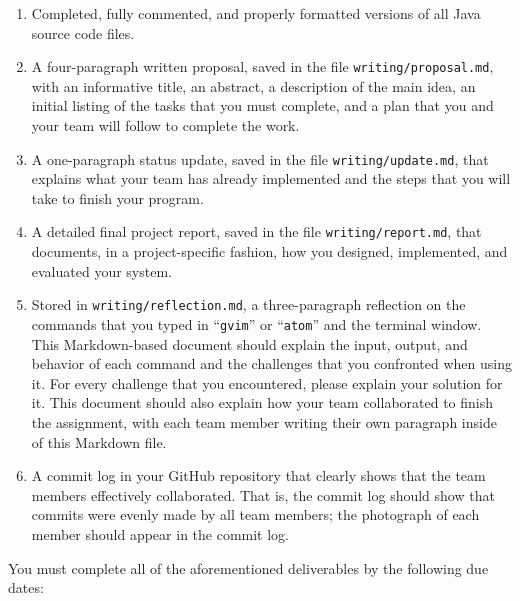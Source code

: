\documentclass[11pt]{article}
\newcommand{\reflection}{\lstinline{writing/reflection.md}}
\newcommand{\command}[1]{``\lstinline{#1}''}
\newcommand{\program}[1]{\lstinline{#1}}
\begin{document}
\begin{enumerate}

  \setlength{\itemsep}{0in}

  \item Completed, fully commented, and properly formatted versions of all Java
    source code files.

  \item A four-paragraph written proposal, saved in the file
    \program{writing/proposal.md}, with an informative title, an abstract, a
    description of the main idea, an initial listing of the tasks that you must
    complete, and a plan that you and your team will follow to complete the
    work.

  \item A one-paragraph status update, saved in the file
    \program{writing/update.md}, that explains what your team has already
    implemented and the steps that you will take to finish your program.

  \item A detailed final project report, saved in the file
    \program{writing/report.md}, that documents, in a project-specific fashion,
    how you designed, implemented, and evaluated your system.

  \item Stored in \reflection{}, a three-paragraph reflection on the commands
    that you typed in \command{gvim} or \command{atom} and the terminal window.
    This Markdown-based document should explain the input, output, and behavior
    of each command and the challenges that you confronted when using it. For
    every challenge that you encountered, please explain your solution for it.
    This document should also explain how your team collaborated to finish the
    assignment, with each team member writing their own paragraph inside of this
    Markdown file.

  \item A commit log in your GitHub repository that clearly shows that the team
    members effectively collaborated. That is, the commit log should show that
    commits were evenly made by all team members; the photograph of each member
    should appear in the commit log.

\end{enumerate}

\noindent
You must complete all of the aforementioned deliverables by the following due dates:
\end{document}
